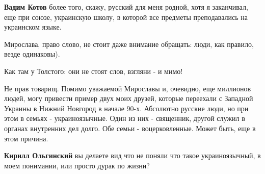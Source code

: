 \begin{itemize}
\begin{itemize}
 
\textbf{Вадим Котов} более того, скажу, русский для меня родной, хотя я
заканчивал, еще при союзе, украинскую школу, в которой все предметы
преподавались на украинском языке.
\end{itemize}

 

Мирослава, право слово, не стоит даже внимание обращать: люди, как правило,
везде одинаковы).

Как там у Толстого: они не стоят слов, взгляни - и мимо!

 

Не прав товарищ. Помимо уважаемой Мирославы и, очевидно, еще миллионов людей,
могу привести пример двух моих друзей, которые переехали с Западной Украины в
Нижний Новгород в начале 90-х. Абсолютно русские люди, но при этом в семьях -
украиноязычные. Один из них - священник, другой служил в органах внутренних дел
долго. Обе семьи - воцерковленные. Может быть, еще в этом причина.

\begin{itemize}
 
\textbf{Кирилл Ольгинский}
вы делаете вид что не поняли что такое украиноязычный, в моем понимании, или просто дурак по жизни?


 

\end{itemize}
\end{itemize}
